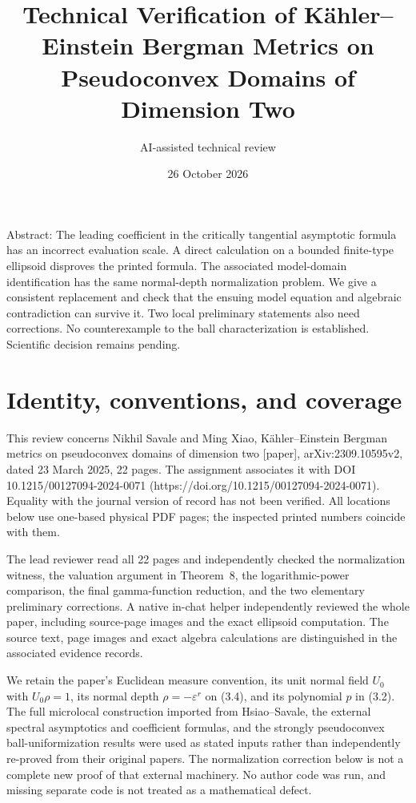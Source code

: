 \documentclass[10pt]{article}
\title{Technical Verification of
Kähler–Einstein Bergman Metrics on Pseudoconvex
Domains of Dimension Two}
\author{AI-assisted technical review}
\date{26 October 2026}
\begin{document}
\maketitle
Abstract: The leading coefficient in the critically tangential asymptotic formula has an incorrect evaluation scale. A direct calculation on a bounded finite-type ellipsoid disproves the printed formula. The associated model-domain identification has the same normal-depth normalization problem. We give a consistent replacement and check that the ensuing model equation and algebraic contradiction can survive it. Two local preliminary statements also need corrections. No counterexample to the ball characterization is established. Scientific decision remains pending.\par
\section*{Identity, conventions, and coverage}
This review concerns Nikhil Savale and Ming Xiao, Kähler–Einstein Bergman metrics on pseudoconvex domains of dimension two [paper], arXiv:2309.10595v2, dated 23 March 2025, 22 pages. The assignment associates it with DOI 10.1215/00127094-2024-0071 (https://doi.org/10.1215/00127094-2024-0071). Equality with the journal version of record has not been verified. All locations below use one-based physical PDF pages; the inspected printed numbers coincide with them.\par
The lead reviewer read all 22 pages and independently checked the normalization witness, the valuation argument in Theorem 8, the logarithmic-power comparison, the final gamma-function reduction, and the two elementary preliminary corrections. A native in-chat helper independently reviewed the whole paper, including source-page images and the exact ellipsoid computation. The source text, page images and exact algebra calculations are distinguished in the associated evidence records.\par
We retain the paper’s Euclidean measure convention, its unit normal field \(U_0\) with \(U_0\rho=1\), its normal depth \(\rho=-\varepsilon^r\) on (3.4), and its polynomial \(p\) in (3.2). The full microlocal construction imported from Hsiao–Savale, the external spectral asymptotics and coefficient formulas, and the strongly pseudoconvex ball-uniformization results were used as stated inputs rather than independently re-proved from their original papers. The normalization correction below is not a complete new proof of that external machinery. No author code was run, and missing separate code is not treated as a mathematical defect.\par
\end{document}
